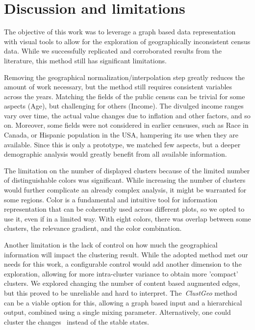 \section{Discussion and limitations}

The objective of this work was to leverage a graph based data representation
with visual tools to allow for the exploration of geographically inconsistent
census data. While we successfully replicated and corroborated results from the
literature, this method still has significant limitations. 


Removing the geographical normalization/interpolation step greatly reduces the
amount of work necessary, but the method still requires consistent variables
across the years. Matching the fields of the public census can be trivial for
some aspects (Age), but challenging for others (Income). The divulged income
ranges vary over time, the actual value changes due to inflation and other
factors, and so on. Moreover, some fields were not considered in earlier
censuses, such as Race in Canada, or Hispanic population in the USA, hampering
its use when they are available. Since this is only a prototype, we matched few
aspects, but a deeper demographic analysis would greatly benefit from all
available information.


The limitation on the number of displayed clusters because of the limited number
of distinguishable colors was significant. While increasing the number of
clusters would further complicate an already complex analysis, it might be
warranted for some regions. Color is a fundamental and intuitive tool for
information representation that can be coherently used across different plots,
so we opted to use it, even if in a limited way. With eight colors, there was
overlap between some clusters, the relevance gradient, and the color
combination. 


Another limitation is the lack of control on how much the geographical
information will impact the clustering result. While the adopted method met our
needs for this work, a configurable control would add another dimension to the
exploration, allowing for more intra-cluster variance to obtain more 'compact'
clusters. We explored changing the number of content based augmented edges, but
this proved to be unreliable and hard to interpret. The~\emph{ClustGeo}
method~\cite{Chavent2017} can be a viable option for this, allowing a graph
based input and a hierarchical output, combined using a single mixing
parameter. Alternatively, one could cluster the changes~\cite{bian2018survey}
instead of the stable states.



